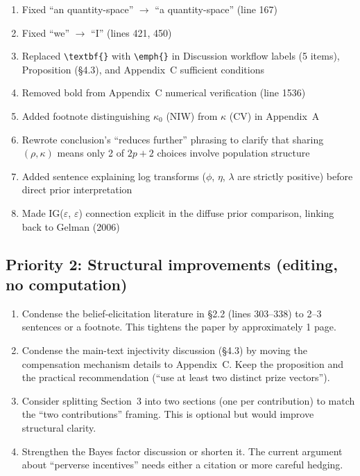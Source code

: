 \documentclass[12pt,a4paper]{article}
\begin{document}
\begin{enumerate}
  \item[{[x]}] Fixed ``an quantity-space'' $\to$ ``a quantity-space'' (line 167)
  \item[{[x]}] Fixed ``we'' $\to$ ``I'' (lines 421, 450)
  \item[{[x]}] Replaced \verb|\textbf{}| with \verb|\emph{}| in Discussion
    workflow labels (5 items), Proposition (\S4.3), and Appendix~C sufficient
    conditions
  \item[{[x]}] Removed bold from Appendix~C numerical verification (line 1536)
  \item[{[x]}] Added footnote distinguishing $\kappa_0$ (NIW) from $\kappa$
    (CV) in Appendix~A
  \item[{[x]}] Rewrote conclusion's ``reduces further'' phrasing to clarify
    that sharing $(\rho, \kappa)$ means only 2 of $2p+2$ choices involve
    population structure
  \item[{[x]}] Added sentence explaining log transforms ($\phi$, $\eta$,
    $\lambda$ are strictly positive) before direct prior interpretation
  \item[{[x]}] Made IG($\varepsilon$, $\varepsilon$) connection explicit in the
    diffuse prior comparison, linking back to Gelman (2006)
\end{enumerate}

\subsection{Priority 2: Structural improvements (editing, no computation)}

\begin{enumerate}
  \item Condense the belief-elicitation literature in \S2.2 (lines 303--338)
    to 2--3 sentences or a footnote. This tightens the paper by approximately
    1 page.
  \item Condense the main-text injectivity discussion (\S4.3) by moving the
    compensation mechanism details to Appendix~C. Keep the proposition and the
    practical recommendation (``use at least two distinct prize vectors'').
  \item Consider splitting Section~3 into two sections (one per contribution)
    to match the ``two contributions'' framing. This is optional but would
    improve structural clarity.
  \item Strengthen the Bayes factor discussion or shorten it. The current
    argument about ``perverse incentives'' needs either a citation or more
    careful hedging.
\end{enumerate}
\end{document}
